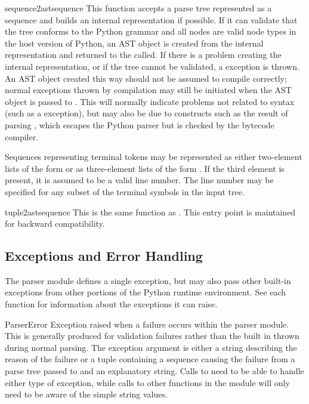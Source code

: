 \begin{funcdesc}{sequence2ast}{sequence}
This function accepts a parse tree represented as a sequence and
builds an internal representation if possible.  If it can validate
that the tree conforms to the Python grammar and all nodes are valid
node types in the host version of Python, an AST object is created
from the internal representation and returned to the called.  If there
is a problem creating the internal representation, or if the tree
cannot be validated, a  exception is thrown.  An AST
object created this way should not be assumed to compile correctly;
normal exceptions thrown by compilation may still be initiated when
the AST object is passed to .  This will normally
indicate problems not related to syntax (such as a 
exception), but may also be due to constructs such as the result of
parsing , which escapes the Python parser but is
checked by the bytecode compiler.

Sequences representing terminal tokens may be represented as either
two-element lists of the form  or as three-element
lists of the form .  If the third element is
present, it is assumed to be a valid line number.  The line number
may be specified for any subset of the terminal symbols in the input
tree.
\end{funcdesc}

\begin{funcdesc}{tuple2ast}{sequence}
This is the same function as .  This entry point is
maintained for backward compatibility.
\end{funcdesc}


\subsection{Exceptions and Error Handling}

The parser module defines a single exception, but may also pass other
built-in exceptions from other portions of the Python runtime
environment.  See each function for information about the exceptions
it can raise.

\begin{excdesc}{ParserError}
Exception raised when a failure occurs within the parser module.  This
is generally produced for validation failures rather than the built in
 thrown during normal parsing.
The exception argument is either a string describing the reason of the
failure or a tuple containing a sequence causing the failure from a parse
tree passed to  and an explanatory string.  Calls to
 need to be able to handle either type of exception,
while calls to other functions in the module will only need to be
aware of the simple string values.
\end{excdesc}

